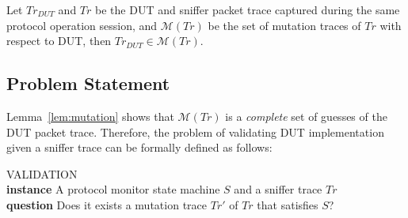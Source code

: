 \begin{lemma}
  Let $Tr_{DUT}$ and $Tr$ be the DUT and sniffer packet trace captured during
  the same protocol operation session, and $\mathcal{M}(Tr)$ be the set of
  mutation traces of $Tr$ with respect to DUT, then $Tr_{DUT} \in \mathcal{M}(Tr)$.
  \label{lem:mutation}
\end{lemma}


\subsection{Problem Statement}
\label{subsec:problem}

Lemma~\ref{lem:mutation} shows that $\mathcal{M}(Tr)$ is a \textit{complete} set
of guesses of the DUT packet trace. Therefore, the problem of validating DUT
implementation given a sniffer trace can be formally defined as follows:

\begin{problem}
  \label{prob:validation}
  VALIDATION\\
  \textbf{instance} A protocol monitor state machine $S$ and a sniffer trace $Tr$\\
  \textbf{question} Does it exists a mutation trace $Tr'$ of $Tr$ that satisfies $S$?
\end{problem}
